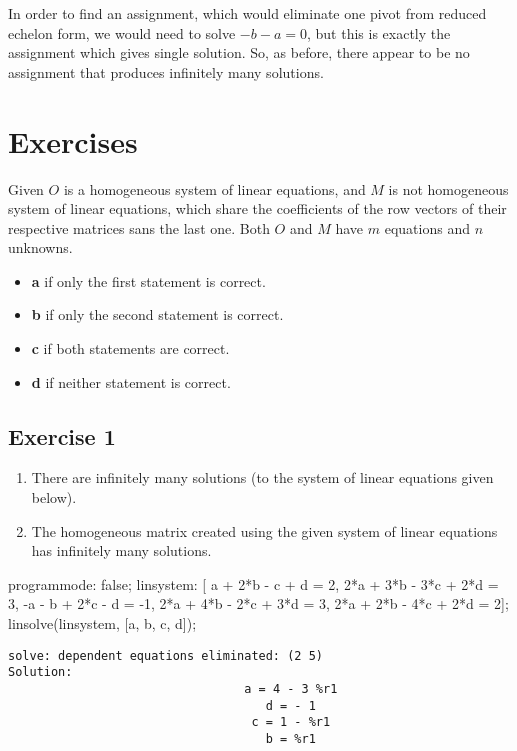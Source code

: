 \documentclass[11pt]{article}
\begin{document}
In order to find an assignment, which would eliminate one pivot from reduced
echelon form, we would need to solve $-b - a = 0$, but this is exactly the
assignment which gives single solution.  So, as before, there appear to be
no assignment that produces infinitely many solutions.
\section{Exercises}
\label{sec-2}
Given $O$ is a homogeneous system of linear equations, and $M$ is not
homogeneous system of linear equations, which share the coefficients of the
row vectors of their respective matrices sans the last one.  Both $O$ and $M$
have $m$ equations and $n$ unknowns.

\begin{itemize}
\item \textbf{a} if only the first statement is correct.
\item \textbf{b} if only the second statement is correct.
\item \textbf{c} if both statements are correct.
\item \textbf{d} if neither statement is correct.
\end{itemize}

\subsection{Exercise 1}
\label{sec-2-1}

\begin{enumerate}
\item There are infinitely many solutions (to the system of linear equations
given below).
\item The homogeneous matrix created using the given system of linear equations
has infinitely many solutions.
\end{enumerate}

\begin{maxima}
programmode: false;
linsystem: [  a + 2*b -   c +   d = 2,
            2*a + 3*b - 3*c + 2*d = 3,
             -a -   b + 2*c -   d = -1,
            2*a + 4*b - 2*c + 3*d = 3,
            2*a + 2*b - 4*c + 2*d = 2];
linsolve(linsystem, [a, b, c, d]);
\end{maxima}

\begin{verbatim}
solve: dependent equations eliminated: (2 5)
Solution:
                                 a = 4 - 3 %r1
                                    d = - 1
                                  c = 1 - %r1
                                    b = %r1
\end{verbatim}
\end{document}
